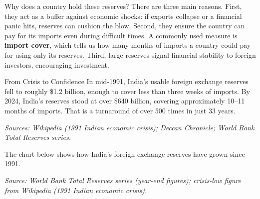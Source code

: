 \documentclass[12pt,a4paper]{article}
\begin{document}
Why does a country hold these reserves? There are three main reasons. First, they act as a buffer against economic shocks: if exports collapse or a financial panic hits, reserves can cushion the blow. Second, they ensure the country can pay for its imports even during difficult times. A commonly used measure is \textbf{import cover}, which tells us how many months of imports a country could pay for using only its reserves. Third, large reserves signal financial stability to foreign investors, encouraging investment.

\begin{didyouknow}{From Crisis to Confidence}
In mid-1991, India's usable foreign exchange reserves fell to roughly \$1.2 billion, enough to cover less than three weeks of imports. By 2024, India's reserves stood at over \$640 billion, covering approximately 10--11 months of imports. That is a turnaround of over 500 times in just 33 years.

\smallskip
{\footnotesize \textit{Sources: Wikipedia (1991 Indian economic crisis); Deccan Chronicle; World Bank Total Reserves series.}}
\end{didyouknow}

The chart below shows how India's foreign exchange reserves have grown since 1991.

\begin{center}

\smallskip
{\footnotesize \textit{Source: World Bank Total Reserves series (year-end figures); crisis-low figure from Wikipedia (1991 Indian economic crisis).}}
\end{center}
\end{document}
